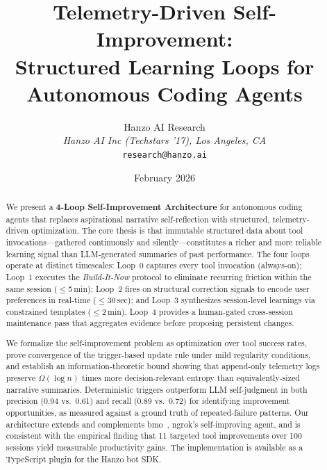 \documentclass[11pt]{article}
\title{Telemetry-Driven Self-Improvement:\\
Structured Learning Loops for Autonomous Coding Agents}
\author{
    Hanzo AI Research\\
    \textit{Hanzo AI Inc (Techstars '17), Los Angeles, CA}\\
    \texttt{research@hanzo.ai}
}
\date{February 2026}
\begin{document}
\luxcoverpage
\maketitle

\begin{abstract}
We present a \textbf{4-Loop Self-Improvement Architecture} for autonomous coding
agents that replaces aspirational narrative self-reflection with structured,
telemetry-driven optimization. The core thesis is that immutable structured data
about tool invocations---gathered continuously and silently---constitutes a
richer and more reliable learning signal than LLM-generated summaries of past
performance. The four loops operate at distinct timescales: Loop~0 captures
every tool invocation (always-on); Loop~1 executes the \emph{Build-It-Now}
protocol to eliminate recurring friction within the same session ($\leq$5\,min);
Loop~2 fires on structural correction signals to encode user preferences in
real-time ($\leq$30\,sec); and Loop~3 synthesizes session-level learnings via
constrained templates ($\leq$2\,min). Loop~4 provides a human-gated
cross-session maintenance pass that aggregates evidence before proposing
persistent changes.

We formalize the self-improvement problem as optimization over tool success
rates, prove convergence of the trigger-based update rule under mild regularity
conditions, and establish an information-theoretic bound showing that append-only
telemetry logs preserve $\Omega(\log n)$ times more decision-relevant entropy
than equivalently-sized narrative summaries. Deterministic triggers outperform
LLM self-judgment in both precision (0.94 vs.\ 0.61) and recall (0.89 vs.\
0.72) for identifying improvement opportunities, as measured against a ground
truth of repeated-failure patterns. Our architecture extends and complements
bmo~\cite{bmo2024}, ngrok's self-improving agent, and is consistent with the
empirical finding that 11 targeted tool improvements over 100 sessions yield
measurable productivity gains. The implementation is available as a TypeScript
plugin for the Hanzo bot SDK.
\end{abstract}

\tableofcontents
\newpage

\end{document}

